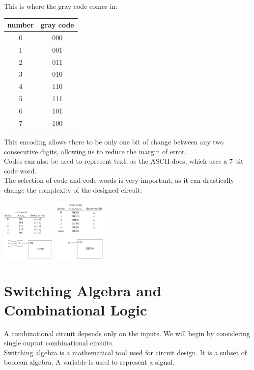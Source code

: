 \documentclass[nobib]{tufte-handout}
\begin{document}
This is where the gray code comes in:\\
\begin{table}
    \centering
    \begin{tabular}{c|c}
        number & gray code \\
        \hline
        0      & 000       \\
        1      & 001       \\
        2      & 011       \\
        3      & 010       \\
        4      & 110       \\
        5      & 111       \\
        6      & 101       \\
        7      & 100       \\
    \end{tabular}
\end{table}
This encoding allows there to be only one bit of change between any two consecutive digits, allowing us to reduce the margin of error.\\
Codes can also be used to represent text, as the ASCII does, which uses a 7-bit code word.\\
The selection of code and code words is very important, as it can drastically change the complexity of the designed circuit:
\begin{center}
    \centering
    \includegraphics[width = 100px]{images/code_ex1.png} \quad
    \includegraphics[width = 100px]{images/code_ex2.png}
\end{center}
\section{Switching Algebra and Combinational Logic}
A combinational circuit depends only on the inputs. We will begin by
considering single ouptut combinational circuits.\\ Switching algebra is a
mathematical tool used for circuit design. It is a subset of boolean algebra. A
variable is used to represent a signal.\\
\end{document}
